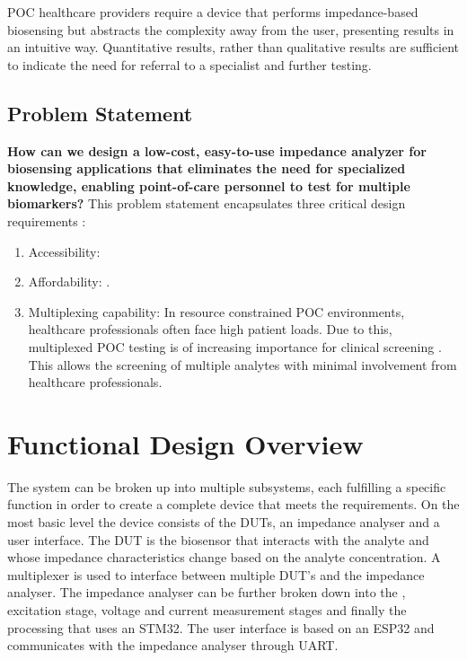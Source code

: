 \Ac{POC} healthcare providers require a device that performs impedance-based biosensing but abstracts the complexity away from the user, presenting results in an intuitive way. Quantitative results, rather than qualitative results are sufficient to indicate the need for referral to a specialist and further testing. 

\subsection{Problem Statement}

\textbf{How can we design a low-cost, easy-to-use impedance analyzer for biosensing applications that eliminates the need for specialized knowledge, enabling point-of-care personnel to test for multiple biomarkers?}
\newline
This problem statement encapsulates three critical design requirements :
\begin{enumerate}
    \item Accessibility: 
    \item Affordability: .
    \item Multiplexing capability: In resource constrained \ac{POC} environments, healthcare professionals often face high patient loads. Due to this, multiplexed \ac{POC} testing is of increasing importance for clinical screening \cite{dincerMultiplexedPointofCareTesting2017}. This allows the screening of multiple analytes with minimal involvement from healthcare professionals.
\end{enumerate}

\section{Functional Design Overview}
The system can be broken up into multiple subsystems, each fulfilling a specific function in order to create a complete device that meets the requirements. On the most basic level the device consists of the \acp{DUT}, an impedance analyser and a user interface. The DUT is the biosensor that interacts with the analyte and whose impedance characteristics change based on the analyte concentration. A multiplexer is used to interface between multiple DUT's and the impedance analyser. The impedance analyser can be further broken down into the , excitation stage, voltage and current measurement stages and finally the processing that uses an STM32. The user interface is based on an ESP32 and communicates with the impedance analyser through UART.

